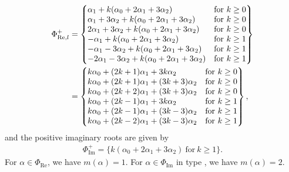 \documentclass[pdftex]{sigma}
\numberwithin{equation}{section}
\theoremstyle{definition}
\begin{document}
\begin{align*}
\Phi_{\mathrm{Re},l}^{+} &=
\left\{
\begin{array}{@{}ll@{}}
 \alpha_1 + k(\alpha_0 + 2\alpha_1 + 3\alpha_2) & \text{for} \  k \geq 0 \\
 \alpha_1 + 3\alpha_2 + k(\alpha_0 + 2\alpha_1 + 3\alpha_2) & \text{for} \  k \geq 0 \\
 2\alpha_1 + 3\alpha_2 + k(\alpha_0 + 2\alpha_1 + 3\alpha_2) & \text{for} \  k \geq 0 \\
 -\alpha_1 + k(\alpha_0 + 2\alpha_1 + 3\alpha_2) & \text{for} \  k \geq 1 \\
 -\alpha_1 - 3\alpha_2 + k(\alpha_0 + 2\alpha_1 + 3\alpha_2) & \text{for} \  k \geq 1 \\
 -2\alpha_1 - 3\alpha_2 + k(\alpha_0 + 2\alpha_1 + 3\alpha_2) & \text{for} \  k \geq 1
\end{array}
\right\} \\
&=
\left\{
\begin{array}{@{}ll@{}}
 k\alpha_0 + (2k+1)\alpha_1 + 3k\alpha_2 & \text{for} \  k \geq 0 \\
 k\alpha_0 + (2k+1)\alpha_1 + (3k+3)\alpha_2 & \text{for} \  k \geq 0 \\
 k\alpha_0 + (2k+2)\alpha_1 + (3k+3)\alpha_2 & \text{for} \  k \geq 0 \\
 k\alpha_0 + (2k-1)\alpha_1 + 3k\alpha_2 & \text{for} \  k \geq 1 \\
 k\alpha_0 + (2k-1)\alpha_1 + (3k-3)\alpha_2 & \text{for} \  k \geq 1 \\
 k\alpha_0 + (2k-2)\alpha_1 + (3k-3)\alpha_2 & \text{for} \  k \geq 1
\end{array}
\right\},
\end{align*}
and the positive imaginary roots are given by
\begin{align*}\Phi_{\mathrm{Im}}^{+} =
\{
k(\alpha_0 + 2\alpha_1 + 3\alpha_2) \ \text{for} \ k \geq 1
\}.
\end{align*}
For $\alpha\in\Phi_{\mathrm{Re}}$, we have $m(\alpha)=1$. For $\alpha\in\Phi_{\mathrm{Im}}$ in type , we have $m(\alpha)=2$.
\end{document}
